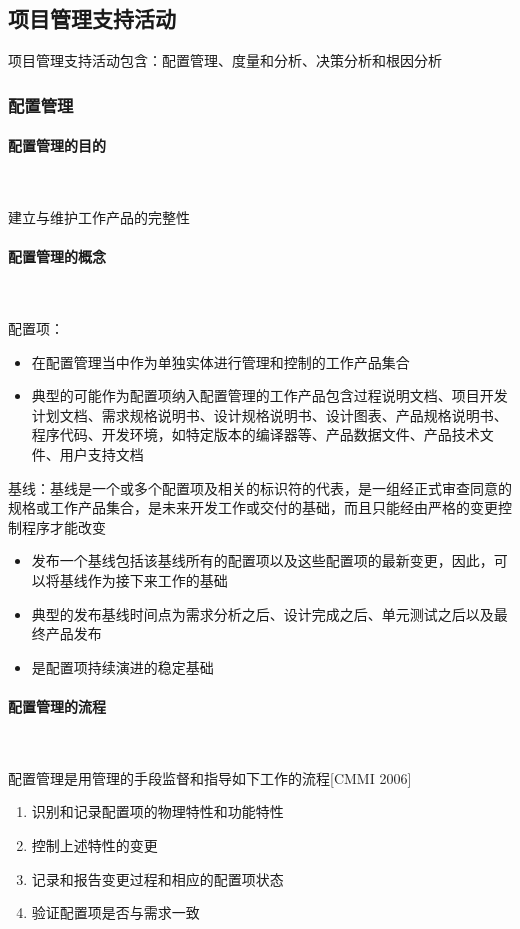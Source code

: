 \subsection{项目管理支持活动}
项目管理支持活动包含：配置管理、度量和分析、决策分析和根因分析

\subsubsection{配置管理}
\paragraph{配置管理的目的}~{} \par
建立与维护工作产品的完整性

\paragraph{配置管理的概念}~{} \par
配置项：
\begin{itemize}
    \item 在配置管理当中作为单独实体进行管理和控制的工作产品集合
    \item 典型的可能作为配置项纳入配置管理的工作产品包含过程说明文档、项目开发计划文档、需求规格说明书、设计规格说明书、设计图表、产品规格说明书、程序代码、开发环境，如特定版本的编译器等、产品数据文件、产品技术文件、用户支持文档
\end{itemize}

基线：基线是一个或多个配置项及相关的标识符的代表，是一组经正式审查同意的规格或工作产品集合，是未来开发工作或交付的基础，而且只能经由严格的变更控制程序才能改变
\begin{itemize}
    \item 发布一个基线包括该基线所有的配置项以及这些配置项的最新变更，因此，可以将基线作为接下来工作的基础
    \item 典型的发布基线时间点为需求分析之后、设计完成之后、单元测试之后以及最终产品发布
    \item 是配置项持续演进的稳定基础
\end{itemize}

\paragraph{配置管理的流程}~{} \par
配置管理是用管理的手段监督和指导如下工作的流程[CMMI 2006]
\vspace{-0.8em}
\begin{multicols}{2}
    \begin{enumerate}[label=\arabic*.]
        \item 识别和记录配置项的物理特性和功能特性
        \item  控制上述特性的变更
        \item 记录和报告变更过程和相应的配置项状态
        \item 验证配置项是否与需求一致
    \end{enumerate}
\end{multicols}
\vspace{-1em}

